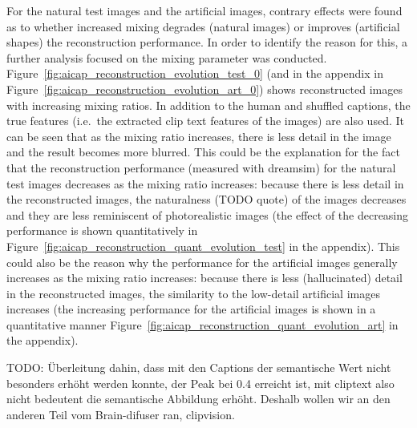For the natural test images and the artificial images, contrary effects were found as to whether increased mixing degrades (natural images) or improves (artificial shapes) the reconstruction performance. In order to identify the reason for this, a further analysis focused on the mixing parameter was conducted. Figure~\ref{fig:aicap_reconstruction_evolution_test_0} (and in the appendix in Figure~\ref{fig:aicap_reconstruction_evolution_art_0}) shows reconstructed images with increasing mixing ratios. In addition to the human and shuffled captions, the true features (i.e.\ the extracted clip text features of the images) are also used. It can be seen that as the mixing ratio increases, there is less detail in the image and the result becomes more blurred. This could be the explanation for the fact that the reconstruction performance (measured with dreamsim) for the natural test images decreases as the mixing ratio increases: because there is less detail in the reconstructed images, the naturalness (TODO quote) of the images decreases and they are less reminiscent of photorealistic images (the effect of the decreasing performance is shown quantitatively in Figure~\ref{fig:aicap_reconstruction_quant_evolution_test} in the appendix). This could also be the reason why the performance for the artificial images generally increases as the mixing ratio increases: because there is less (hallucinated) detail in the reconstructed images, the similarity to the low-detail artificial images increases (the increasing performance for the artificial images is shown in a quantitative manner Figure~\ref{fig:aicap_reconstruction_quant_evolution_art} in the appendix).



TODO: Überleitung dahin, dass mit den Captions der semantische Wert nicht besonders erhöht werden konnte, der Peak bei 0.4 erreicht ist, mit cliptext also nicht bedeutent die semantische Abbildung erhöht. Deshalb wollen wir an den anderen Teil vom Brain-difuser ran, clipvision. 